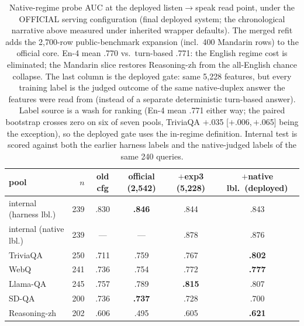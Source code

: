 \begin{table}[t]
\centering\small
\caption{Native-regime probe AUC at the deployed listen$\to$speak
read point, under the OFFICIAL serving configuration (final deployed
system; the chronological narrative above measured under inherited
wrapper defaults). The merged refit adds the 2{,}700-row
public-benchmark expansion (incl.\ 400 Mandarin rows) to the official
core. En-4 mean .770 vs.\ turn-based .771: the English regime cost
is eliminated; the Mandarin slice restores Reasoning-zh from the
all-English chance collapse. The last column is the deployed gate:
same 5{,}228 features, but every training label is the judged
outcome of the same native-duplex answer the features were
read from (instead of a separate deterministic turn-based answer).
Label source is a wash for ranking (En-4 mean .771 either way; the
paired bootstrap crosses zero on six of seven pools, TriviaQA
$+$.035 [$+$.006,\,$+$.065] being the exception), so the deployed
gate uses the in-regime definition. Internal test is scored against both the
earlier harness labels and the native-judged labels of the same
240 queries.}
\label{tab:native-auc}
\scriptsize
\setlength{\tabcolsep}{3.5pt}
\begin{tabular}{lrcccc}
\toprule
pool & $n$ & old cfg & official (2{,}542) & $+$exp3 (5{,}228) & \textbf{$+$native lbl.\ (deployed)} \\
\midrule
internal (harness lbl.) & 239 & .830 & \textbf{.846} & .844 & .843 \\
internal (native lbl.) & 239 & --- & --- & .878 & .876 \\
TriviaQA & 250 & .711 & .759 & .767 & \textbf{.802} \\
WebQ & 241 & .736 & .754 & .772 & \textbf{.777} \\
Llama-QA & 245 & .757 & .789 & \textbf{.815} & .807 \\
SD-QA & 200 & .736 & \textbf{.737} & .728 & .700 \\
Reasoning-zh & 202 & .606 & .495 & .605 & \textbf{.621} \\
\bottomrule
\end{tabular}
\end{table}

